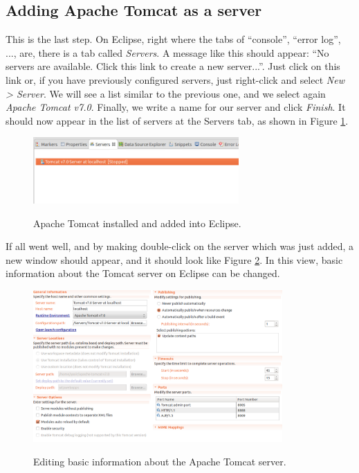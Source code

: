 \subsection{Adding Apache Tomcat as a server}
\label{subsec:addserver}

This is the last step. On Eclipse, right where the tabs of ``console'', ``error log'', ..., are, there is a tab called \textit{Servers}. A message like this should appear: ``No servers are available. Click this link to create a new server...''. Just click on this link or, if you have previously configured servers, just right-click and select \textit{New > Server}. We will see a list similar to the previous one, and we select again \textit{Apache Tomcat v7.0}. Finally, we write a name for our server and click \textit{Finish}. It should now appear in the list of servers at the Servers tab, as shown in Figure \ref{fig:createdtomcat}.

\begin{figure}
  \begin{center}
    \includegraphics[width=0.7\textwidth]{./Figures/createdtomcat.png}
    \label{fig:createdtomcat}
    \caption{Apache Tomcat installed and added into Eclipse.}
  \end{center}
\end{figure}

If all went well, and by making double-click on the server which was just added, a new window should appear, and it should look like Figure \ref{fig:serverconfig}. In this view, basic information about the Tomcat server on Eclipse can be changed.

\begin{figure}
  \begin{center}
    \includegraphics[width=0.85\textwidth]{./Figures/serverconfig.png}
    \label{fig:serverconfig}
    \caption{Editing basic information about the Apache Tomcat server.}
  \end{center}
\end{figure}

